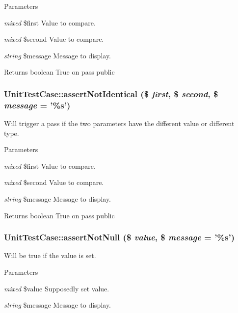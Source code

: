\begin{DoxyParams}{Parameters}
\item[{\em mixed}]\$first Value to compare. \item[{\em mixed}]\$second Value to compare. \item[{\em string}]\$message Message to display. \end{DoxyParams}
\begin{DoxyReturn}{Returns}
boolean True on pass  public 
\end{DoxyReturn}
\hypertarget{class_unit_test_case_a35ac184f9c99528c11929ca8a177ebf9}{
\subsubsection[{assertNotIdentical}]{\setlength{\rightskip}{0pt plus 5cm}UnitTestCase::assertNotIdentical (\$ {\em first}, \/  \$ {\em second}, \/  \$ {\em message} = {\ttfamily '\%s'})}}
\label{class_unit_test_case_a35ac184f9c99528c11929ca8a177ebf9}
Will trigger a pass if the two parameters have the different value or different type. 
\begin{DoxyParams}{Parameters}
\item[{\em mixed}]\$first Value to compare. \item[{\em mixed}]\$second Value to compare. \item[{\em string}]\$message Message to display. \end{DoxyParams}
\begin{DoxyReturn}{Returns}
boolean True on pass  public 
\end{DoxyReturn}
\hypertarget{class_unit_test_case_ac03def71a0930bb27c6bfe166187a30d}{
\subsubsection[{assertNotNull}]{\setlength{\rightskip}{0pt plus 5cm}UnitTestCase::assertNotNull (\$ {\em value}, \/  \$ {\em message} = {\ttfamily '\%s'})}}
\label{class_unit_test_case_ac03def71a0930bb27c6bfe166187a30d}
Will be true if the value is set. 
\begin{DoxyParams}{Parameters}
\item[{\em mixed}]\$value Supposedly set value. \item[{\em string}]\$message Message to display. \end{DoxyParams}
